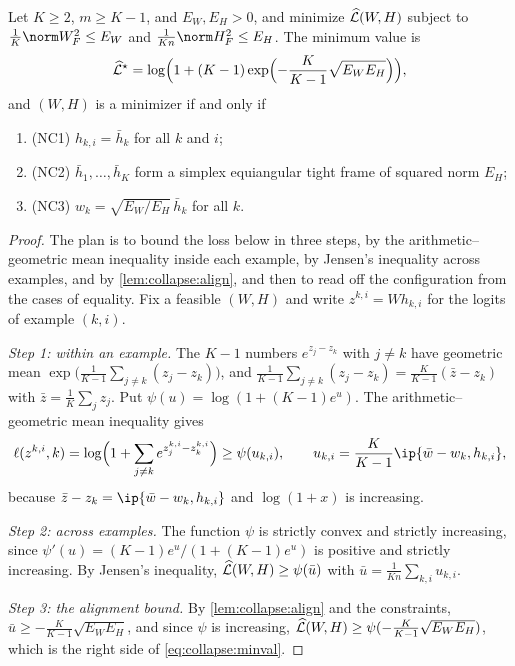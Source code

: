\begin{refsection}
\begin{theorem}\label{thm:collapse:main}
Let $K\ge2$, $m\ge K-1$, and $E_W,E_H>0$, and minimize $\widehat{\mathcal{L}}(W,H)$ subject to $\frac1K\norm W_F^2\le E_W$ and $\frac1{Kn}\norm H_F^2\le E_H$. The minimum value is
\begin{equation}\label{eq:collapse:minval}
  \widehat{\mathcal{L}}^\star=\log\Bigl(1+(K-1)\exp\Bigl(-\frac K{K-1}\sqrt{E_WE_H}\Bigr)\Bigr),
\end{equation}
and $(W,H)$ is a minimizer if and only if
\begin{enumerate}
\item (NC1) $h_{k,i}=\bar h_k$ for all $k$ and $i$;
\item (NC2) $\bar h_1,\dots,\bar h_K$ form a simplex equiangular tight frame of squared norm $E_H$;
\item (NC3) $w_k=\sqrt{E_W/E_H}\,\bar h_k$ for all $k$.
\end{enumerate}
\end{theorem}

\begin{proof}
The plan is to bound the loss below in three steps, by the arithmetic--geometric mean inequality inside each example, by Jensen's inequality across examples, and by \cref{lem:collapse:align}, and then to read off the configuration from the cases of equality. Fix a feasible $(W,H)$ and write $z^{k,i}=Wh_{k,i}$ for the logits of example $(k,i)$.

\emph{Step 1: within an example.} The $K-1$ numbers $e^{z_j-z_k}$ with $j\ne k$ have geometric mean $\exp\bigl(\frac1{K-1}\sum_{j\ne k}(z_j-z_k)\bigr)$, and $\frac1{K-1}\sum_{j\ne k}(z_j-z_k)=\frac K{K-1}(\bar z-z_k)$ with $\bar z=\frac1K\sum_jz_j$. Put $\psi(u)=\log(1+(K-1)e^u)$. The arithmetic--geometric mean inequality gives
\[
  \ell(z^{k,i},k)=\log\Bigl(1+\sum_{j\ne k}e^{z^{k,i}_j-z^{k,i}_k}\Bigr)\ge\psi(u_{k,i}),\qquad u_{k,i}=\frac K{K-1}\ip{\bar w-w_k,h_{k,i}},
\]
because $\bar z-z_k=\ip{\bar w-w_k,h_{k,i}}$ and $\log(1+x)$ is increasing.

\emph{Step 2: across examples.} The function $\psi$ is strictly convex and strictly increasing, since $\psi'(u)=(K-1)e^u/(1+(K-1)e^u)$ is positive and strictly increasing. By Jensen's inequality, $\widehat{\mathcal{L}}(W,H)\ge\psi(\bar u)$ with $\bar u=\frac1{Kn}\sum_{k,i}u_{k,i}$.

\emph{Step 3: the alignment bound.} By \cref{lem:collapse:align} and the constraints, $\bar u\ge-\frac K{K-1}\sqrt{E_WE_H}$, and since $\psi$ is increasing, $\widehat{\mathcal{L}}(W,H)\ge\psi(-\frac K{K-1}\sqrt{E_WE_H})$, which is the right side of \eqref{eq:collapse:minval}.


\end{proof}
\end{refsection}
